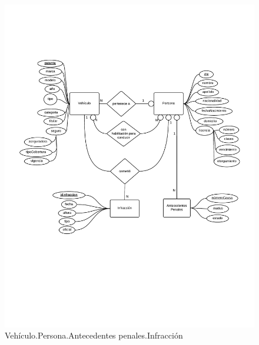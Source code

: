 \newpage
\begin{figure}
  \begin{center}
    \includegraphics[scale=0.8]{diagramas/2-2.pdf}
    \caption{Vehículo.Persona.Antecedentes penales.Infracción}
  \end{center}
\end{figure}

